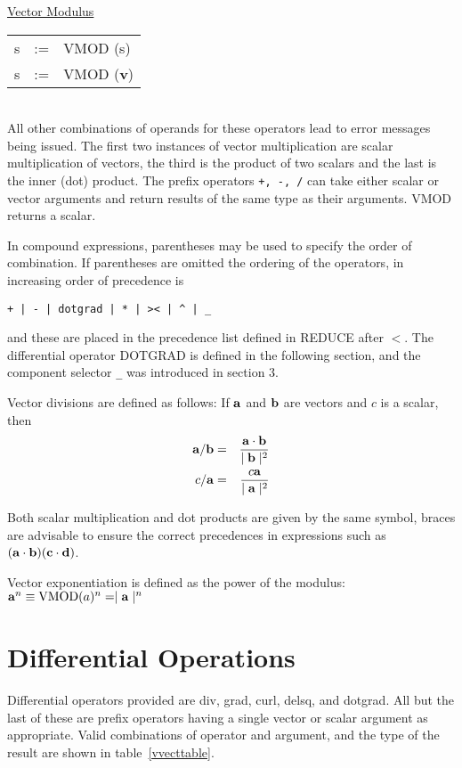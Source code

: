 \underline{Vector Modulus}\\
 
\begin{tabular}{rcl}
   s    &:=& VMOD (s)\\
   s    &:=& VMOD ({\bf v}) \\
\end{tabular} \\

All other combinations of operands for these operators lead to error
messages being issued.  The first two instances of vector
multiplication are scalar multiplication of vectors, the third is the
 
 
product of two scalars and the last is the inner (dot) product.  The
prefix operators  {\tt +, -, /} can take either scalar or vector
arguments and return results of the same type as their arguments.
VMOD returns a scalar.

In compound expressions, parentheses may be used to specify the order of
combination.  If parentheses are omitted the ordering of the
operators, in increasing order of precedence is
\begin{verbatim}
+ | - | dotgrad | * | >< | ^ | _
\end{verbatim}
and these are placed in the precedence list defined in REDUCE
after $<$.
The differential operator DOTGRAD is defined in the 
following section, and the component selector {\tt \_} was introduced in
section 3.

Vector divisions are defined as follows:  If ${\bf a}$ and ${\bf b}$ are
vectors and $c$ is a scalar, then
\begin{eqnarray*}
{\bf a} /  {\bf b} & = &  \frac{{\bf a} \cdot {\bf b}}{  \mid {\bf b}
\mid^2}\\
c / {\bf a}   & = &  \frac{c {\bf a}  }{ \mid {\bf a} \mid^2}
\end{eqnarray*}

Both scalar multiplication and dot products are given by the same symbol,
braces are advisable to ensure the correct
precedences in expressions such as $({\bf a} \cdot {\bf b})
({\bf c} \cdot {\bf d})$.

Vector exponentiation is defined as the power of the modulus:\\
${\bf a}^n \equiv  {\rm VMOD}(a)^n =   \mid {\bf a} \mid^n$

\section{Differential Operations}
Differential operators provided are div, grad, curl, delsq, and dotgrad.
  
 
All but the last of these are prefix operators having a single
vector or scalar argument as appropriate.  Valid combinations of
operator and argument, and the type of the result are shown in table~\ref{vvecttable}.


